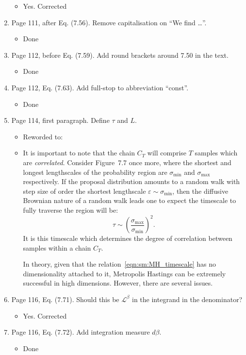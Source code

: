 \documentclass[11pt]{article}
\begin{document}
\begin{enumerate}
  \begin{itemize}
      \item Yes. Corrected
  \end{itemize}
\item Page 111, after Eq. (7.56). Remove capitalisation on ``We find
  \ldots''.
  \begin{itemize}
      \item Done
  \end{itemize}
\item Page 112, before Eq. (7.59). Add round brackets around 7.50 in
  the text.
  \begin{itemize}
      \item Done
  \end{itemize}
\item Page 112, Eq. (7.63). Add full-stop to abbreviation ``const''.
    \begin{itemize}
        \item Done
    \end{itemize}
\item Page 114, first paragraph. Define $\tau$ and $L$.
    \begin{itemize}
        \item Reworded to:
        \item It is important to note that the chain \(C_T\) will comprise \(T\) samples which are {\em correlated}. Consider Figure~7.7 once more, where the shortest and longest lengthscales of the probability region are \(\sigma_{\min{}}\) and \(\sigma_{\max{}}\) respectively. If the proposal distribution amounts to a random walk with step size of order the shortest lengthscale \(\varepsilon\sim\sigma_{\min{}}\), then the diffusive Brownian nature of a random walk leads one to expect the timescale to fully traverse the region will be:
            \begin{equation}
                \tau \sim {\left( \frac{\sigma_{\max{}}}{\sigma_{\min{}}} \right)}^2.
                \label{eqn:sm:MH_timescale}
            \end{equation}
            It is this timescale which determines the degree of correlation between samples within a chain \(C_T\).

            In theory, given that the relation~\eqref{eqn:sm:MH_timescale} has no dimensionality attached to it, Metropolis Hastings can be extremely successful in high dimensions. However, there are several issues.

    \end{itemize}
\item Page 116, Eq. (7.71). Should this be $\mathcal{L}^\beta$ in the
  integrand in the denominator?
  \begin{itemize}
      \item Yes. Corrected
  \end{itemize}
\item Page 116, Eq. (7.72). Add integration measure $d\beta$.
    \begin{itemize}
        \item Done
    \end{itemize}
\end{enumerate}
\end{document}
